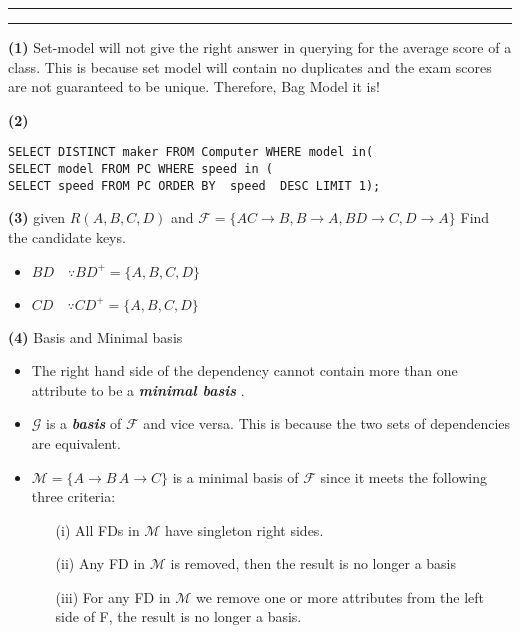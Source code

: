 \documentclass[a4paper, 11pt]{article}
\newcommand{\question}[2] {\vspace{.25in} \hrule\vspace{0.5em}
\noindent{\bf #1: #2} \vspace{0.5em}
\hrule \vspace{.10in}}
\renewcommand{\part}[1] {\vspace{.10in} {\bf (#1)}}
\begin{document}
\question{Exam Revisit}{}
\part{1} Set-model will not give the right answer in querying for the average score of a class. This is because set model will contain no duplicates and the exam scores are not guaranteed to be unique. Therefore, Bag Model it is!

\part{2} 
\begin{verbatim}
SELECT DISTINCT maker FROM Computer WHERE model in(
SELECT model FROM PC WHERE speed in (
SELECT speed FROM PC ORDER BY  speed  DESC LIMIT 1);
\end{verbatim}

\part{3}    given $R(A,B,C,D)$ and $ \mathcal{F} =\{AC \rightarrow B, B \rightarrow A, BD \rightarrow C, D \rightarrow A \}$ Find the candidate keys.
\begin{itemize}
\item $BD \quad \because BD^+ = \{ A,B ,C, D\}$ 
\item $CD \quad \because CD^+ = \{ A,B ,C, D\}$ 
\end{itemize}


\part{4}  Basis and Minimal basis
\begin{itemize}
\item The right hand side of the dependency cannot contain more than one attribute to be a \textit{\textbf{minimal basis}} .
\item $\mathcal{G}$ is a \textit{\textbf{basis}} of $ \mathcal{F}$ and vice versa. This is because the two sets of dependencies are equivalent. 
\item $\mathcal{M} = \{ A \rightarrow B\, A \rightarrow C \}$ is a minimal basis of $\mathcal{F}$ since it meets the following three criteria:
\begin{itemize}
\item[(i)] All FDs in $\mathcal{M} $  have singleton right sides.
\item[(ii)] Any FD in $\mathcal{M} $  is removed, then the result is no longer a basis
\item[(iii)] For any FD in $\mathcal{M}$ we remove one or more attributes from the left side of F, the result is no longer a basis.
\end{itemize} 
\end{itemize}
\end{document}
